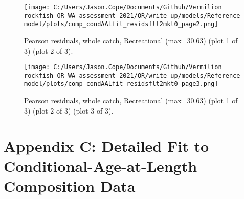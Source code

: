 \documentclass[11pt,
  english,
  a4paper,
]{article}
\begin{document}
\begin{figure}
\centering
\texttt{[image: C:/Users/Jason.Cope/Documents/Github/Vermilion rockfish OR WA assessment 2021/OR/write\_up/models/Reference model/plots/comp\_condAALfit\_residsflt2mkt0\_page2.png]}
\caption{Pearson residuals, whole catch, Recreational (max=30.63) (plot 1 of 3) (plot 2 of 3).\label{fig:comp_condAALfit_residsflt2mkt0_page2}}
\end{figure}

\tagmcend\tagstructend


\begin{figure}
\centering
\texttt{[image: C:/Users/Jason.Cope/Documents/Github/Vermilion rockfish OR WA assessment 2021/OR/write\_up/models/Reference model/plots/comp\_condAALfit\_residsflt2mkt0\_page3.png]}
\caption{Pearson residuals, whole catch, Recreational (max=30.63) (plot 1 of 3) (plot 2 of 3) (plot 3 of 3).\label{fig:comp_condAALfit_residsflt2mkt0_page3}}
\end{figure}

\tagmcend\tagstructend

\clearpage


\hypertarget{app-c}{%
\section{Appendix C: Detailed Fit to Conditional-Age-at-Length Composition Data}\label{app-c}}

\leavevmode\tagmcend\tagstructend
\end{document}
